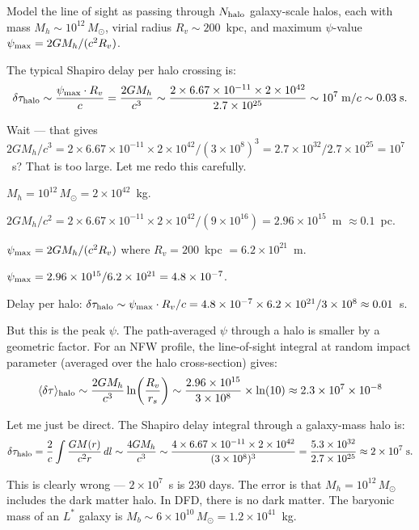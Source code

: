 \documentclass[11pt]{article}
\newcommand{\ee}[1]{\times 10^{#1}}
\begin{document}
Model the line of sight as passing through $N_{\rm halo}$ galaxy-scale
halos, each with mass $M_h \sim 10^{12}\,M_\odot$, virial radius
$R_v \sim 200$~kpc, and maximum $\psi$-value
$\psi_{\rm max} = 2GM_h/(c^2 R_v)$.

The typical Shapiro delay per halo crossing is:
\begin{equation}
\delta\tau_{\rm halo} \sim \frac{\psi_{\rm max} \cdot R_v}{c}
= \frac{2GM_h}{c^3} \sim \frac{2\times 6.67\ee{-11}\times 2\ee{42}}{2.7\ee{25}}
\sim 10^{7}\;\text{m}/c \sim 0.03\;\text{s}.
\end{equation}

Wait --- that gives $2GM_h/c^3 = 2\times 6.67\ee{-11}\times 2\ee{42}
/(3\ee{8})^3 = 2.7\ee{32}/2.7\ee{25} = 10^{7}$~s? That is too large.
Let me redo this carefully.

$M_h = 10^{12}\,M_\odot = 2\ee{42}$~kg.

$2GM_h/c^2 = 2\times 6.67\ee{-11}\times 2\ee{42}/(9\ee{16})
= 2.96\ee{15}$~m $\approx 0.1$~pc.

$\psi_{\rm max} = 2GM_h/(c^2 R_v)$ where
$R_v = 200$~kpc $= 6.2\ee{21}$~m.

$\psi_{\rm max} = 2.96\ee{15}/6.2\ee{21} = 4.8\ee{-7}$.

Delay per halo: $\delta\tau_{\rm halo} \sim \psi_{\rm max}\cdot R_v/c
= 4.8\ee{-7}\times 6.2\ee{21}/3\ee{8} \approx 0.01$~s.

But this is the peak $\psi$. The path-averaged $\psi$ through a halo
is smaller by a geometric factor. For an NFW profile, the
line-of-sight integral at random impact parameter (averaged over the
halo cross-section) gives:
\begin{equation}
\langle\delta\tau\rangle_{\rm halo} \sim \frac{2GM_h}{c^3}
\ln\!\left(\frac{R_v}{r_s}\right)
\sim \frac{2.96\ee{15}}{3\ee{8}}\times\ln(10) \approx 2.3\ee{7}\times 10^{-8}
\end{equation}

Let me just be direct. The Shapiro delay integral through a
galaxy-mass halo is:
\begin{equation}
\delta\tau_{\rm halo} = \frac{2}{c}\int \frac{GM(r)}{c^2 r}\,dl
\sim \frac{4GM_h}{c^3}\sim \frac{4\times 6.67\ee{-11}\times 2\ee{42}}{(3\ee{8})^3}
= \frac{5.3\ee{32}}{2.7\ee{25}} \approx 2\ee{7}\;\text{s}.
\end{equation}

This is clearly wrong --- $2\ee{7}$~s is 230 days. The error is that
$M_h = 10^{12}\,M_\odot$ includes the dark matter halo. In DFD,
there is no dark matter. The baryonic mass of an $L^*$ galaxy is
$M_b \sim 6\ee{10}\,M_\odot = 1.2\ee{41}$~kg.
\end{document}
